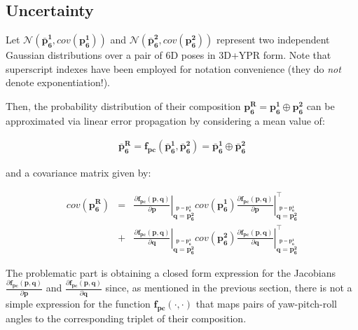 \documentclass[a4paper,11pt]{report}
\begin{document}
\subsection{Uncertainty}

Let $\mathcal{N}(\mathbf{\bar{p}_6^1}, cov(\mathbf{p_6^1}))$ and
$\mathcal{N}(\mathbf{\bar{p}_6^2}, cov(\mathbf{p_6^2}))$ represent
two independent Gaussian distributions over a pair of 6D
poses in 3D+YPR form.
Note that superscript indexes have been employed
for notation convenience (they do \emph{not} denote exponentiation!).

Then, the probability distribution of their composition
$\mathbf{p_6^R} = \mathbf{p_6^1} \oplus \mathbf{p_6^2}$
can be approximated via linear error propagation by considering
a mean value of:

\begin{eqnarray}
\mathbf{\bar{p}_6^R}
= \mathbf{f_{pc}}(\mathbf{\bar{p}_6^1}, \mathbf{\bar{p}_6^2})
= \mathbf{\bar{p}_6^1} \oplus \mathbf{\bar{p}_6^2}
\end{eqnarray}

\noindent and a covariance matrix given by:

\begin{eqnarray}
cov(\mathbf{p_6^R}) &=&
\left. \frac{\partial \mathbf{f_{pc}}(\mathbf{p},\mathbf{q}) }{\partial \mathbf{p}} \right|_{\overset{ \mathbf{p}=\mathbf{p_6^1} }{ \mathbf{q}=\mathbf{p_6^2} }}
cov(\mathbf{p_6^1})
\left. \frac{\partial \mathbf{f_{pc}}(\mathbf{p},\mathbf{q}) }{\partial \mathbf{p}} \right|_{\overset{ \mathbf{p}=\mathbf{p_6^1} }{ \mathbf{q}=\mathbf{p_6^2} }}^\top
\nonumber \\ &+&
\left. \frac{\partial \mathbf{f_{pc}}(\mathbf{p},\mathbf{q}) }{\partial \mathbf{q}} \right|_{\overset{ \mathbf{p}=\mathbf{p_6^1} }{ \mathbf{q}=\mathbf{p_6^2} }}
cov(\mathbf{p_6^2})
\left. \frac{\partial \mathbf{f_{pc}}(\mathbf{p},\mathbf{q}) }{\partial \mathbf{q}} \right|_{\overset{ \mathbf{p}=\mathbf{p_6^1} }{ \mathbf{q}=\mathbf{p_6^2} }}^\top
\end{eqnarray}

The problematic part is obtaining a closed form expression for the
Jacobians
$\frac{\partial \mathbf{f_{pc}}(\mathbf{p},\mathbf{q}) }{\partial \mathbf{p}}$
and
$\frac{\partial \mathbf{f_{pc}}(\mathbf{p},\mathbf{q}) }{\partial \mathbf{q}}$
since, as mentioned in the previous section, there is not a simple expression
for the function $\mathbf{f_{pc}}(\cdot,\cdot)$ that maps pairs of yaw-pitch-roll angles
to the corresponding triplet of their composition.
\end{document}
